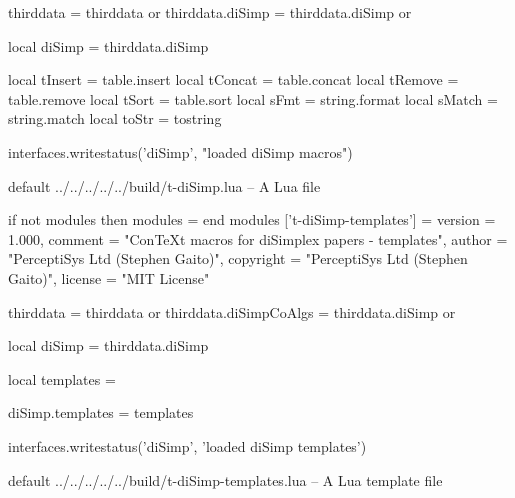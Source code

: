 thirddata        = thirddata        or {}
thirddata.diSimp = thirddata.diSimp or {}

local diSimp   = thirddata.diSimp

local tInsert = table.insert
local tConcat = table.concat
local tRemove = table.remove
local tSort   = table.sort
local sFmt    = string.format
local sMatch  = string.match
local toStr   = tostring

interfaces.writestatus('diSimp', "loaded diSimp macros")
\stopLuaCode

\createLuaCodeFile%
  {default}%
  {../../../../../build/t-diSimp.lua}%
  {-- A Lua file}

\startLuaTemplate
if not modules then modules = { } end modules ['t-diSimp-templates'] = {
    version   = 1.000,
    comment   = "ConTeXt macros for diSimplex papers - templates",
    author    = "PerceptiSys Ltd (Stephen Gaito)",
    copyright = "PerceptiSys Ltd (Stephen Gaito)",
    license   = "MIT License"
}

thirddata              = thirddata        or {}
thirddata.diSimpCoAlgs = thirddata.diSimp or {}

local diSimp     = thirddata.diSimp

local templates  = { }

diSimp.templates = templates

interfaces.writestatus('diSimp', 'loaded diSimp templates')
\stopLuaTemplate

\createLuaTemplateFile%
  {default}%
  {../../../../../build/t-diSimp-templates.lua}%
  {-- A Lua template file}
